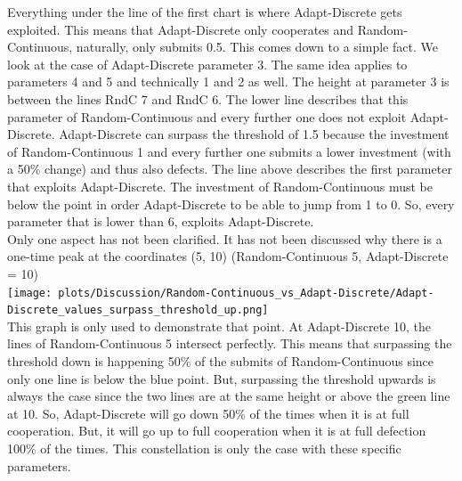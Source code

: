 \documentclass{article}
\begin{document}
\begin{itemize}
		Everything under the line of the first chart is where Adapt-Discrete gets exploited.
		This means that Adapt-Discrete only cooperates and Random-Continuous, naturally, only submits 0.5.
		This comes down to a simple fact.
		We look at the case of Adapt-Discrete parameter 3.
		The same idea applies to parameters 4 and 5 and technically 1 and 2 as well.
		The height at parameter 3 is between the lines RndC 7 and RndC 6.
		The lower line describes that this parameter of Random-Continuous and every further one does not exploit Adapt-Discrete.
		Adapt-Discrete can surpass the threshold of 1.5 because the investment of Random-Continuous 1 and every further one submits a lower investment (with a 50\% change) and thus also defects.
		The line above describes the first parameter that exploits Adapt-Discrete.
		The investment of Random-Continuous must be below the point in order Adapt-Discrete to be able to jump from 1 to 0.
		So, every parameter that is lower than 6, exploits Adapt-Discrete.\\
		Only one aspect has not been clarified.
		It has not been discussed why there is a one-time peak at the coordinates (5, 10) \textrightarrow (Random-Continuous 5, Adapt-Discrete = 10)\\
		\texttt{[image: plots/Discussion/Random-Continuous\_vs\_Adapt-Discrete/Adapt-Discrete\_values\_surpass\_threshold\_up.png]}\\
		This graph is only used to demonstrate that point.
		At Adapt-Discrete 10, the lines of Random-Continuous 5 intersect perfectly.
		This means that surpassing the threshold down is happening 50\% of the submits of Random-Continuous since only one line is below the blue point.
		But, surpassing the threshold upwards is always the case since the two lines are at the same height or above the green line at 10.
		So, Adapt-Discrete will go down 50\% of the times when it is at full cooperation.
		But, it will go up to full cooperation when it is at full defection 100\% of the times.
		This constellation is only the case with these specific parameters.

\end{itemize}
\end{document}
